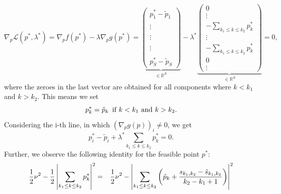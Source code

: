 \documentclass{scrreprt}
\newenvironment{proof}[1][Proof]{\begin{trivlist}
\item[\hskip \labelsep {\bfseries #1}]}{\end{trivlist}}
\begin{document}
\begin{proof}
                $$
                    \nabla_{p} \mathcal{L}(p^{\ast}, \lambda^{\ast}) = \nabla_{p} f(p^{\ast}) - \lambda \nabla_{p} g(p^{\ast}) =
                    \underbrace{\begin{pmatrix}
                        p^{\ast}_{1} - \tilde{p}_{1} \\
                         \\
                        \vdots \\
                         \\
                        \vdots \\
                         \\
                        \vdots \\
                         \\
                        p^{\ast}_{S} - \tilde{p}_{S}
                    \end{pmatrix}}_{\in \mathbb{R}^{S}}
                    - \lambda^{\ast}
                    \underbrace{\begin{pmatrix}
                        0 \\
                        \vdots \\
                        - \sum\limits_{k_{1} \le k \le k_{2}} p^{\ast}_{k} \\
                        \vdots \\
                        - \sum\limits_{k_{1} \le k \le k_{2}} p^{\ast}_{k} \\
                        0 \\
                        \vdots
                    \end{pmatrix}}_{\in \mathbb{R}^{S}}
                    = 0,
                $$
            where the zeroes in the last vector are obtained for all components where $k < k_{1}$ and $k > k_{2}$. This means we set
                $$
                    p^{\ast}_{k} = \tilde{p}_{k} \,\,\, \textnormal{if} \,\, k < k_{1} \,\, \textnormal{and} \,\, k > k_{2}.
                $$
            Considering the i-th line, in which $(\nabla_{p} g(p))_{i} \ne 0$, we get
                $$
                    p^{\ast}_{i} - \tilde{p}_{i} + \lambda^{\ast} \sum_{k_{1} \le k \le k_{2}} p^{\ast}_{k} = 0.
                $$
            Further, we observe the following identity for the feasible point $p^{\ast}$:
                \begin{eqnarray}
                    \frac{1}{2} \nu^{2} - \frac{1}{2} \left|\sum_{k_{1} \le k \le k_{2}} p^{\ast}_{k}\right|^{2} &=& \frac{1}{2} \nu^{2} - \left|\sum_{k_{1} \le k \le k_{2}} \left( \tilde{p}_{k} + \frac{s_{k_{1}, k_{2}} - \tilde{s}_{k_{1}, k_{2}}}{k_{2} - k_{1} + 1} \right) \right|^{2} \notag \\

\end{eqnarray}
\end{proof}
\end{document}
